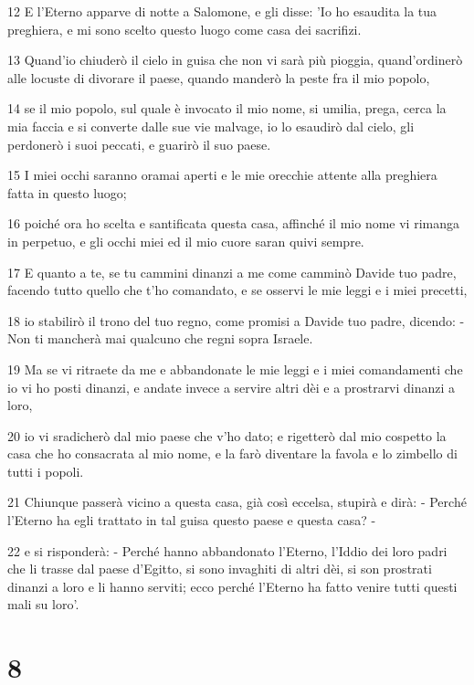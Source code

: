 \par 12 E l'Eterno apparve di notte a Salomone, e gli disse: 'Io ho esaudita la tua preghiera, e mi sono scelto questo luogo come casa dei sacrifizi.
\par 13 Quand'io chiuderò il cielo in guisa che non vi sarà più pioggia, quand'ordinerò alle locuste di divorare il paese, quando manderò la peste fra il mio popolo,
\par 14 se il mio popolo, sul quale è invocato il mio nome, si umilia, prega, cerca la mia faccia e si converte dalle sue vie malvage, io lo esaudirò dal cielo, gli perdonerò i suoi peccati, e guarirò il suo paese.
\par 15 I miei occhi saranno oramai aperti e le mie orecchie attente alla preghiera fatta in questo luogo;
\par 16 poiché ora ho scelta e santificata questa casa, affinché il mio nome vi rimanga in perpetuo, e gli occhi miei ed il mio cuore saran quivi sempre.
\par 17 E quanto a te, se tu cammini dinanzi a me come camminò Davide tuo padre, facendo tutto quello che t'ho comandato, e se osservi le mie leggi e i miei precetti,
\par 18 io stabilirò il trono del tuo regno, come promisi a Davide tuo padre, dicendo: - Non ti mancherà mai qualcuno che regni sopra Israele.
\par 19 Ma se vi ritraete da me e abbandonate le mie leggi e i miei comandamenti che io vi ho posti dinanzi, e andate invece a servire altri dèi e a prostrarvi dinanzi a loro,
\par 20 io vi sradicherò dal mio paese che v'ho dato; e rigetterò dal mio cospetto la casa che ho consacrata al mio nome, e la farò diventare la favola e lo zimbello di tutti i popoli.
\par 21 Chiunque passerà vicino a questa casa, già così eccelsa, stupirà e dirà: - Perché l'Eterno ha egli trattato in tal guisa questo paese e questa casa? -
\par 22 e si risponderà: - Perché hanno abbandonato l'Eterno, l'Iddio dei loro padri che li trasse dal paese d'Egitto, si sono invaghiti di altri dèi, si son prostrati dinanzi a loro e li hanno serviti; ecco perché l'Eterno ha fatto venire tutti questi mali su loro'.

\chapter{8}


